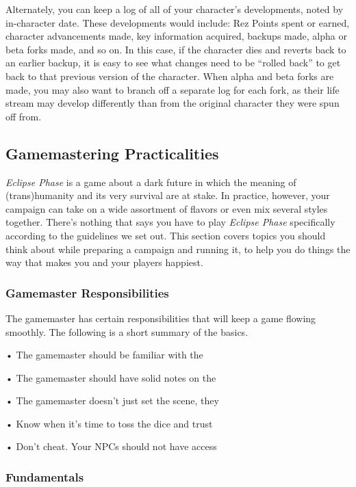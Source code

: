 Alternately, you can keep a log of all of your 
character's developments, noted by in-character 
date. These developments would include: Rez Points 
spent or earned, character advancements made, key 
information acquired, backups made, alpha or beta 
forks made, and so on. In this case, if the character 
dies and reverts back to an earlier backup, it is easy 
to see what changes need to be ``rolled back'' to get 
back to that previous version of the character. When 
alpha and beta forks are made, you may also want to 
branch off a separate log for each fork, as their life 
stream may develop differently than from the original 
character they were spun off from.

\subsection{Gamemastering Practicalities}

\textit{Eclipse Phase} is a game about a dark future in which 
the meaning of (trans)humanity and its very survival 
are at stake. In practice, however, your campaign can 
take on a wide assortment of flavors or even mix 
several styles together. There's nothing that says you 
have to play \textit{Eclipse Phase} specifically according to 
the guidelines we set out. This section covers topics 
you should think about while preparing a campaign 
and running it, to help you do things the way that 
makes you and your players happiest.

\subsubsection{Gamemaster Responsibilities }

The gamemaster has certain responsibilities that will 
keep a game flowing smoothly. The following is a 
short summary of the basics.

•  The gamemaster should be familiar with the 

•  The gamemaster should have solid notes on the 

•  The gamemaster doesn't just set the scene, they 

•  Know when it's time to toss the dice and trust 

•  Don't cheat. Your NPCs should not have access 

\subsubsection{Fundamentals}

